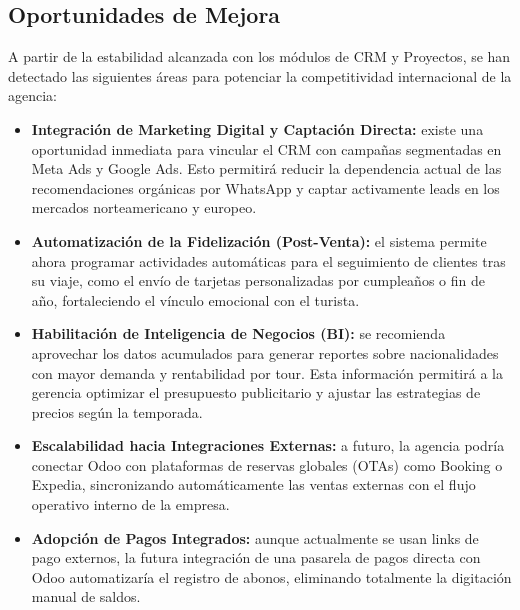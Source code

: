 \subsection{Oportunidades de Mejora}
A partir de la estabilidad alcanzada con los módulos de CRM y Proyectos, se han detectado las
siguientes áreas para potenciar la competitividad internacional de la agencia:

\begin{itemize}
    \item \textbf{Integración de Marketing Digital y Captación Directa:} existe una oportunidad inmediata para vincular el CRM con campañas segmentadas en Meta Ads y Google Ads. Esto permitirá reducir la dependencia actual de las recomendaciones orgánicas por WhatsApp y captar activamente leads en los mercados norteamericano y europeo.
    \item \textbf{Automatización de la Fidelización (Post-Venta):} el sistema permite ahora programar actividades automáticas para el seguimiento de clientes tras su viaje, como el envío de tarjetas personalizadas por cumpleaños o fin de año, fortaleciendo el vínculo emocional con el turista.
    \item \textbf{Habilitación de Inteligencia de Negocios (BI):} se recomienda aprovechar los datos acumulados para generar reportes sobre nacionalidades con mayor demanda y rentabilidad por tour. Esta información permitirá a la gerencia optimizar el presupuesto publicitario y ajustar las estrategias de precios según la temporada.
    \item \textbf{Escalabilidad hacia Integraciones Externas:} a futuro, la agencia podría conectar Odoo con plataformas de reservas globales (OTAs) como Booking o Expedia, sincronizando automáticamente las ventas externas con el flujo operativo interno de la empresa.
    \item \textbf{Adopción de Pagos Integrados:} aunque actualmente se usan links de pago externos, la futura integración de una pasarela de pagos directa con Odoo automatizaría el registro de abonos, eliminando totalmente la digitación manual de saldos.
\end{itemize}
